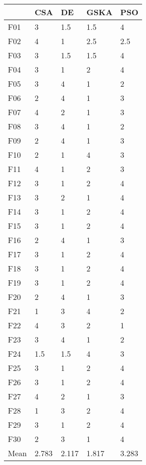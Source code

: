 \begin{tabular}{lllll}
\toprule
{} &    CSA &     DE &   GSKA &    PSO \\
\midrule
F01  &      3 &    1.5 &    1.5 &      4 \\
F02  &      4 &      1 &    2.5 &    2.5 \\
F03  &      3 &    1.5 &    1.5 &      4 \\
F04  &      3 &      1 &      2 &      4 \\
F05  &      3 &      4 &      1 &      2 \\
F06  &      2 &      4 &      1 &      3 \\
F07  &      4 &      2 &      1 &      3 \\
F08  &      3 &      4 &      1 &      2 \\
F09  &      2 &      4 &      1 &      3 \\
F10  &      2 &      1 &      4 &      3 \\
F11  &      4 &      1 &      2 &      3 \\
F12  &      3 &      1 &      2 &      4 \\
F13  &      3 &      2 &      1 &      4 \\
F14  &      3 &      1 &      2 &      4 \\
F15  &      3 &      1 &      2 &      4 \\
F16  &      2 &      4 &      1 &      3 \\
F17  &      3 &      1 &      2 &      4 \\
F18  &      3 &      1 &      2 &      4 \\
F19  &      3 &      1 &      2 &      4 \\
F20  &      2 &      4 &      1 &      3 \\
F21  &      1 &      3 &      4 &      2 \\
F22  &      4 &      3 &      2 &      1 \\
F23  &      3 &      4 &      1 &      2 \\
F24  &    1.5 &    1.5 &      4 &      3 \\
F25  &      3 &      1 &      2 &      4 \\
F26  &      3 &      1 &      2 &      4 \\
F27  &      4 &      2 &      1 &      3 \\
F28  &      1 &      3 &      2 &      4 \\
F29  &      3 &      1 &      2 &      4 \\
F30  &      2 &      3 &      1 &      4 \\
Mean &  2.783 &  2.117 &  1.817 &  3.283 \\
\bottomrule
\end{tabular}
